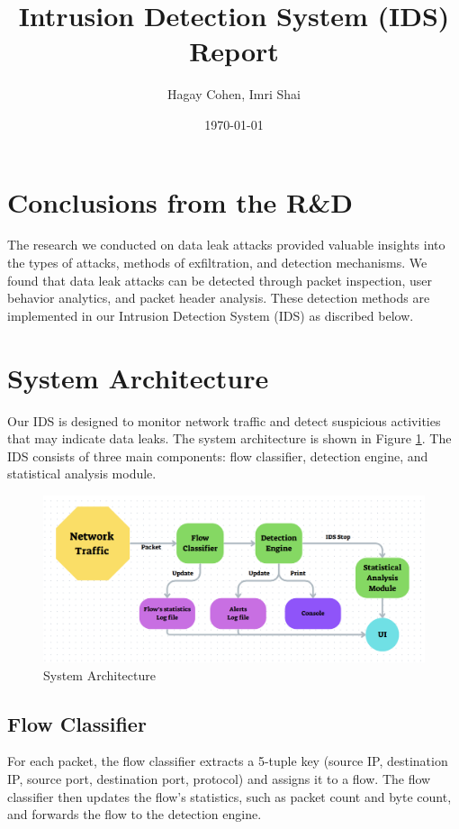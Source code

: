 \documentclass{article}
\title{Intrusion Detection System (IDS) Report}
\author{Hagay Cohen, Imri Shai}
\date{\today}
\begin{document}
\maketitle

\section{Conclusions from the R\&D}
The research we conducted on data leak attacks provided valuable insights into the types of attacks, methods of exfiltration, and detection mechanisms. We found that data leak attacks can be detected through packet inspection, user behavior analytics, and packet header analysis. These detection methods are implemented in our Intrusion Detection System (IDS) as discribed below.


\section{System Architecture}
Our IDS is designed to monitor network traffic and detect suspicious activities that may indicate data leaks. 
The system architecture is shown in Figure \ref{fig:architecture}.
The IDS consists of three main components: flow classifier, detection engine, and statistical analysis module.
\begin{figure}[h!]
    \centering
    \includegraphics[width=\textwidth]{Screenshots/fig_1.png}
    \caption{System Architecture}
    \label{fig:architecture}
\end{figure}

\subsection{Flow Classifier}
For each packet, the flow classifier extracts a 5-tuple key (source IP, destination IP, source port, destination port, protocol) and assigns it to a flow.
The flow classifier then updates the flow's statistics, such as packet count and byte count, and forwards the flow to the detection engine.
\end{document}
